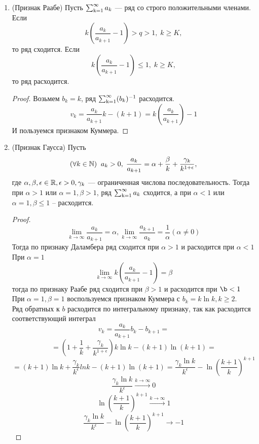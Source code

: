 \begin{enumerate}
\begin{proof}
Так как $a_Kb_K \ge l\sum\limits_{j=K+1}^{n}a_j$, то частичные суммы ряда $\sum\limits_{j=K+1}^{\infty}a_j$ ограничены и, значит, ряд $\ssum a_k$ сходится.
Итак, $$v_k = \frac{a_k}{a_{k+1}}b_k - b_{k+1} \le 0 \text{ при } k \ge K,$$
т.е. $a_k b_k - a_{k+1}b_{k+1}\le 0$ при $k \ge K$.
Значит, $$ \sum_{k=K}^{n-1} \big( a_k b_k-a_{k+1}b_{k+1} \big) = a_K b_K - a_n b_n \le 0,\; n>K$$
отсюда: $a_N \ge a_Kb_K - (b_n)^{-1}$. Из расходимости ряда $\ssum b_k$ следует расходимость ряда $\ssum a_k$
\end{proof}
\item
(Признак Раабе) Пусть $\ssum a_k$ --- ряд со строго положительными членами.
Если $$k \left( \frac{a_k}{a_{k+1}} -1 \right) > q > 1,\; k \ge K,$$
то ряд сходится.
Если $$k \left( \frac{a_k}{a_{k+1}} -1 \right) \le 1,\; k \ge K,$$
то ряд расходится.
\begin{proof}
Возьмем $b_k =k$, ряд $\operatorname{\sum_{k=1}^{\infty}} (b_k)^{-1}$ расходится.
$$v_k = \frac{a_k}{a_{k+1}}k - (k+1) = k (\frac{a_k}{a_{k+1}}) -1 $$
И пользуемся признаком Куммера.
\end{proof}
\item
(Признак Гаусса) Пусть 
$$(\forall k \in \operatorname{\mathbb{N}}) \;\; a_k>0,\; \frac{a_k}{a_{k+1}} = \alpha + \frac{\beta}{k}+\frac{\gamma_k}{k^{1+\epsilon}}, $$
где $\alpha, \beta, \epsilon \in \operatorname{\mathbb{R}}, \epsilon > 0, \gamma_k$ --- ограниченная числова последовательность.
Тогда при $\alpha > 1$ или $\alpha = 1, \beta > 1$, ряд $\ssum a_k$ сходится, а  при $\alpha < 1$ или $\alpha = 1, \beta \le 1$ -- расходится.
\begin{proof}
$$\lim_{k \to \infty} \frac{a_k}{a_{k+1}} = \alpha, \lim_{k \to \infty} \frac{a_{k+1}}{a_k} = \frac{1}{\alpha} (\alpha \not=0)$$
Тогда по признаку Даламбера ряд сходится при $\alpha > 1$ и расходится при $\alpha < 1$\\
При $\alpha = 1$\\
$$\lim_{k \to \infty} k ( \frac{a_k}{a_{k+1}} -1 ) = \beta $$
тогда по признаку Раабе ряд сходится при $\beta > 1$ и расходится при $\b < 1$\\
При $\alpha =1, \beta =1$ воспользуемся признаком Куммера с $b_k = k \ln k, k\ge 2.$\\
Ряд обратных к $b$ расходится по интегральному признаку, так как расходится соответствующий интеграл
$$v_k = \frac{a_k}{a_{k+1}}b_k - b_{k+1} =$$
$$= \left(1 + \frac{1}{k} + \frac{\gamma_k}{k^{1+\epsilon}} \right) k \ln k - (k+1)\ln(k+1) =$$
$$=(k+1)\ln k + \frac{\gamma_k}{k^{\epsilon}}ln k - (k+1)\ln(k+1) = \frac{\gamma_k \ln k}{k^{\epsilon}} - \ln(\frac{k+1}{k})^{k+1}$$
$$\frac{\gamma_k \ln k}{k^{\epsilon}} \xrightarrow{k \to \infty} 0$$
$$\ln(\frac{k+1}{k})^{k+1} \xrightarrow{k \to \infty} 1$$
$$\frac{\gamma_k \ln k}{k^{\epsilon}} - \ln(\frac{k+1}{k})^{k+1} \to -1 $$
\end{proof}
\end{enumerate}
